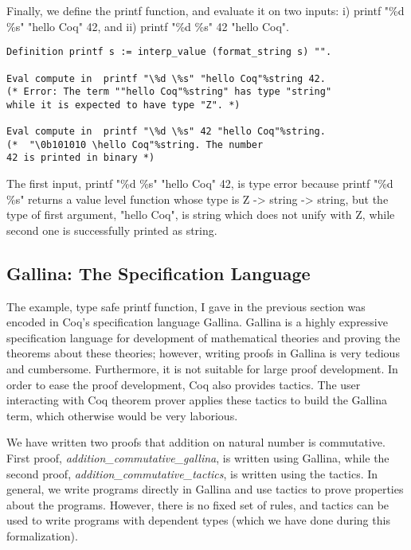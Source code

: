 \noindent
Finally, we define the printf function, and evaluate it on two inputs: 
i)  printf "\%d \%s" "hello Coq" 42, and ii)  printf "\%d \%s" 42 "hello Coq".

\begin{verbatim}
Definition printf s := interp_value (format_string s) "".           

Eval compute in  printf "\%d \%s" "hello Coq"%string 42.
(* Error: The term ""hello Coq"%string" has type "string" 
while it is expected to have type "Z". *)

Eval compute in  printf "\%d \%s" 42 "hello Coq"%string. 
(*  "\0b101010 \hello Coq"%string. The number 
42 is printed in binary *)                            
\end{verbatim}
The first input, printf "\%d \%s" "hello Coq" 42, is type error because 
printf "\%d \%s" returns a value level function whose  type is Z -> string -> string, but 
the type of first argument, "hello Coq", is string which does not unify with Z,
while second one is successfully printed as string. 

  
  

 
 \subsection{Gallina: The Specification Language}
 \label{sec:gallina}
  The example, type safe printf function, I gave in the previous 
  section was encoded in Coq's specification language Gallina. 
  Gallina is a highly expressive specification 
  language for development of mathematical theories and proving the    
  theorems about these  theories; however, writing proofs in Gallina
  is very tedious and cumbersome. Furthermore,  it is not suitable for large proof 
  development. In order to ease the proof development, Coq also provides 
  tactics.  The user interacting with Coq theorem prover applies these 
  tactics to build the  Gallina term,  which otherwise would  
  be very laborious.
  
 We have written two proofs that addition on natural number is commutative. 
 First proof, \textit{addition\_commutative\_gallina}, is written using 
 Gallina, while the second proof, \textit{addition\_commutative\_tactics}, is written 
 using the tactics.  In general, we write programs directly in Gallina and use tactics 
 to prove properties about the programs. However, there is no fixed set of rules, and tactics 
 can be used to write programs with dependent types (which we have done during this
 formalization).
 
